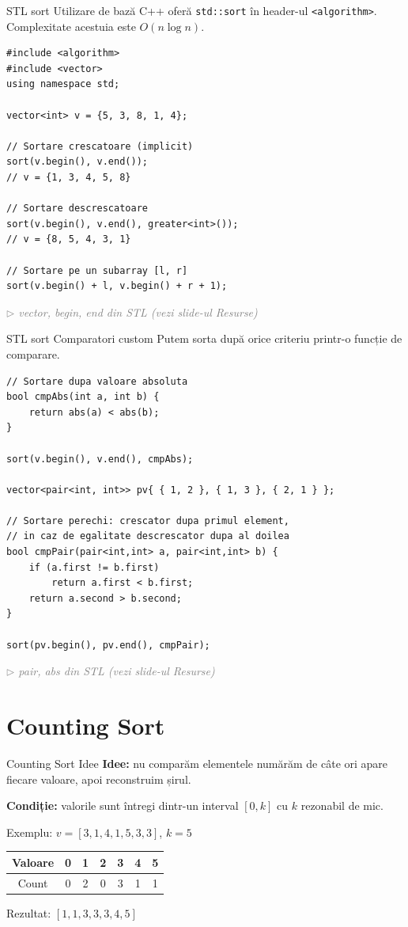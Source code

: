 ﻿\documentclass{beamer}
\newcommand{\beginnote}[1]{%
  \vfill
  {\footnotesize\textcolor{gray}{\textit{$\triangleright$ #1 (vezi slide-ul \emph{Resurse})}}}%
}
\begin{document}
\begin{frame}{STL sort \textemdash{} Utilizare de bază}
  C++ oferă \lstinline|std::sort| în header-ul \lstinline|<algorithm>|.
  Complexitate acestuia este $O(n \log n)$.
  \begin{lstlisting}
#include <algorithm>
#include <vector>
using namespace std;

vector<int> v = {5, 3, 8, 1, 4};

// Sortare crescatoare (implicit)
sort(v.begin(), v.end());
// v = {1, 3, 4, 5, 8}

// Sortare descrescatoare
sort(v.begin(), v.end(), greater<int>());
// v = {8, 5, 4, 3, 1}

// Sortare pe un subarray [l, r]
sort(v.begin() + l, v.begin() + r + 1);
  \end{lstlisting}
  \beginnote{vector, begin, end \textemdash{} din STL}
  \end{frame}

\begin{frame}{STL sort \textemdash{} Comparatori custom}
  Putem sorta după orice criteriu printr-o funcție de comparare.
  \begin{lstlisting}
// Sortare dupa valoare absoluta
bool cmpAbs(int a, int b) {
    return abs(a) < abs(b);
}

sort(v.begin(), v.end(), cmpAbs);

vector<pair<int, int>> pv{ { 1, 2 }, { 1, 3 }, { 2, 1 } };

// Sortare perechi: crescator dupa primul element,
// in caz de egalitate descrescator dupa al doilea
bool cmpPair(pair<int,int> a, pair<int,int> b) {
    if (a.first != b.first)
        return a.first < b.first;
    return a.second > b.second;
}

sort(pv.begin(), pv.end(), cmpPair);
  \end{lstlisting}
  \beginnote{pair, abs \textemdash{} din STL}
\end{frame}

\section{Counting Sort}

\begin{frame}{Counting Sort \textemdash{} Idee}
  \textbf{Idee:} nu comparăm elementele \textemdash{} numărăm de câte ori apare fiecare valoare, apoi reconstruim șirul.

  \bigskip
  \textbf{Condiție:} valorile sunt întregi dintr-un interval $[0, k]$ cu $k$ rezonabil de mic.

  \bigskip
  Exemplu: $v = [3, 1, 4, 1, 5, 3, 3]$, $k = 5$
  \begin{center}
  \begin{tabular}{ccccccc}
    \toprule
    Valoare & 0 & 1 & 2 & 3 & 4 & 5 \\
    \midrule
    Count   & 0 & 2 & 0 & 3 & 1 & 1 \\
    \bottomrule
  \end{tabular}
  \end{center}
  \medskip
  Rezultat: $[1, 1, 3, 3, 3, 4, 5]$
\end{frame}
\end{document}
